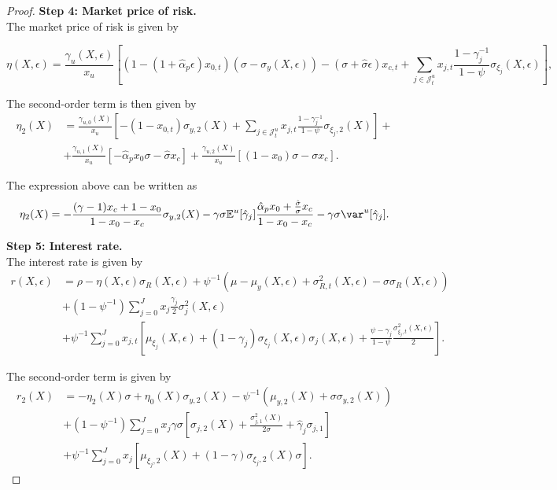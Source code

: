 \begin{proof}
\noindent\textbf{Step 4: Market price of risk.}\\
The market price of risk is given by
\begin{small}
	\begin{equation}
	\eta(X,\epsilon) =  \frac{\gamma_u(X,\epsilon)}{x_{u}} \left[ (1-(1+\hat{\alpha}_p \epsilon) x_{0,t})(\sigma - \sigma_{y}(X,\epsilon)) - (\sigma + \hat{\sigma}\epsilon) x_{c,t}+ \sum_{j\in \mathcal{J}_t^u} x_{j,t} \frac{1-\gamma_j^{-1}}{1-\psi} \sigma_{\xi_j}(X,\epsilon)\right],
	\end{equation}	
\end{small}

The second-order term is then given by
\begin{align}
    \eta_2(X) &=  \frac{\gamma_{u,0}(X)}{x_{u}} \left[ -(1-x_{0,t})\sigma_{y,2}(X) + \sum_{j\in \mathcal{J}_t^u} x_{j,t} \frac{1-\gamma_j^{-1}}{1-\psi} \sigma_{\xi_j,2}(X)\right] + \nonumber\\
    &+ \frac{\gamma_{u,1}(X)}{x_{u}} \left[ - \hat{\alpha}_p x_{0} \sigma -\hat{\sigma} x_{c}\right]+ \frac{\gamma_{u,2}(X)}{x_{u}} \left[ (1-x_{0})\sigma - \sigma x_{c} \right].
\end{align}

The expression above can be written as
\begin{align}
    \eta_2(X) =  - \frac{(\gamma-1) x_c + 1-x_0}{1-x_0-x_c} \sigma_{y,2}(X) - \gamma \sigma \mathbb{E}^u[\hat{\gamma}_j] \frac{ \hat{\alpha}_p x_0+ \frac{\hat{\sigma}}{\sigma}x_c }{1-x_0-x_c} - \gamma \sigma \var^u[\hat{\gamma}_j].
\end{align}

\noindent\textbf{Step 5: Interest rate.}\\
The interest rate is given by
\begin{align}
     r(X,\epsilon)   &  =  \rho - \eta(X,\epsilon) \sigma_{R}(X,\epsilon) +\psi^{-1} (\mu - \mu_{y}(X,\epsilon)+\sigma_{R,t}^2(X,\epsilon)- \sigma \sigma_{R}(X,\epsilon))\nonumber\\
     &+ \left(1-\psi^{-1}\right)  \sum_{j=0}^J x_{j}\frac{\gamma_j}{2} \sigma_{j}^2(X,\epsilon)  \nonumber\\
    &+\psi^{-1}\sum_{j=0}^J x_{j,t} \left[\mu_{\xi_j}(X,\epsilon) + (1-\gamma_j)  \sigma_{\xi_j}(X,\epsilon) \sigma_{j}(X,\epsilon) + \frac{\psi - \gamma_j}{1-\psi} \frac{\sigma_{\xi_j,t}^2(X,\epsilon)}{2}\right].
\end{align}

The second-order term is given by
\begin{align}
    r_2(X) &= - \eta_2(X) \sigma + \eta_0(X) \sigma_{y,2}(X)-\psi^{-1} (\mu_{y,2}(X) + \sigma \sigma_{y,2}(X))\nonumber\\
    &+ \left(1-\psi^{-1}\right) \sum_{j=0}^J x_{j} \gamma\sigma \left[ \sigma_{j,2}(X) + \frac{\sigma_{j,1}^2(X)}{2 \sigma} + \hat{\gamma}_j \sigma_{j,1} \right]\nonumber\\
    &+\psi^{-1} \sum_{j=0}^J x_{j}\left[ \mu_{\xi_j,2}(X) + (1-\gamma) \sigma_{\xi_j,2}(X) \sigma \right].
\end{align}


\end{proof}
